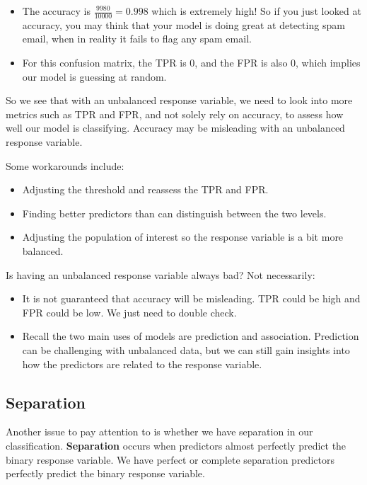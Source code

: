 \documentclass[
]{book}
\providecommand{\tightlist}{%
  \setlength{\itemsep}{0pt}\setlength{\parskip}{0pt}}
\begin{document}
\begin{itemize}
\tightlist
\item
  The accuracy is \(\frac{9980}{10000} = 0.998\) which is extremely high! So if you just looked at accuracy, you may think that your model is doing great at detecting spam email, when in reality it fails to flag any spam email.
\item
  For this confusion matrix, the TPR is 0, and the FPR is also 0, which implies our model is guessing at random.
\end{itemize}

So we see that with an unbalanced response variable, we need to look into more metrics such as TPR and FPR, and not solely rely on accuracy, to assess how well our model is classifying. Accuracy may be misleading with an unbalanced response variable.

Some workarounds include:

\begin{itemize}
\tightlist
\item
  Adjusting the threshold and reassess the TPR and FPR.
\item
  Finding better predictors than can distinguish between the two levels.
\item
  Adjusting the population of interest so the response variable is a bit more balanced.
\end{itemize}

Is having an unbalanced response variable always bad? Not necessarily:

\begin{itemize}
\tightlist
\item
  It is not guaranteed that accuracy will be misleading. TPR could be high and FPR could be low. We just need to double check.
\item
  Recall the two main uses of models are prediction and association. Prediction can be challenging with unbalanced data, but we can still gain insights into how the predictors are related to the response variable.
\end{itemize}

\hypertarget{separation}{%
\subsection{Separation}\label{separation}}

Another issue to pay attention to is whether we have separation in our classification. \textbf{Separation} occurs when predictors almost perfectly predict the binary response variable. We have perfect or complete separation predictors perfectly predict the binary response variable.
\end{document}
